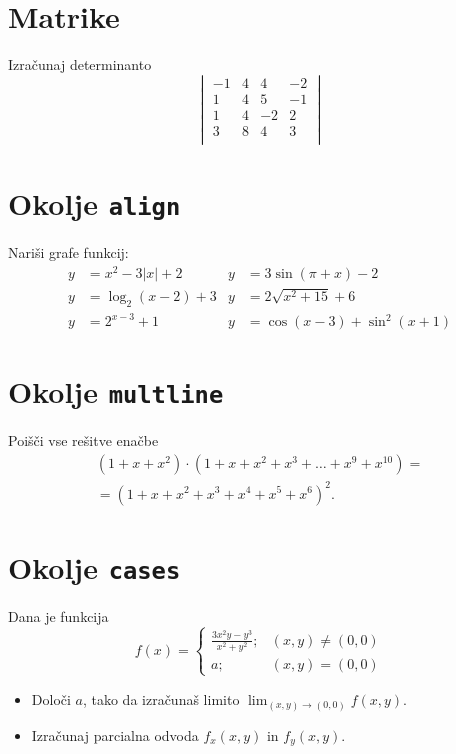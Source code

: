 \documentclass[a4paper,12pt]{article}
\begin{document}
\section*{Matrike}
Izračunaj determinanto
\[\begin{vmatrix}
-1 & 4 & 4 & -2 \\
 1 & 4 & 5 & -1 \\
 1 & 4 & -2 & 2 \\
 3 & 8 & 4 & 3 \\
\end{vmatrix}\]
   

\section*{Okolje \texttt{align}}
Nariši grafe funkcij:
\begin{align*}
   y & = x^2 - 3|x| + 2   & y & = 3 \sin(\pi+x) - 2 \\
   y & = \log_2(x-2) + 3  & y & = 2 \sqrt{x^2+15} + 6 \\
   y & = 2^{x-3} + 1      & y & = \cos(x-3) + \sin^2(x+1)
\end{align*}
 
\section*{Okolje \texttt{multline}}
Poišči vse rešitve enačbe
\begin{multline*}
(1+x+x^2) \cdot (1+x+x^2+x^3+\ldots+x^9+x^{10}) =
\\=(1+x+x^2+x^3+x^4+x^5+x^6)^2.
\end{multline*}

\section*{Okolje \texttt{cases}}
Dana je funkcija
\[ f(x) = \begin{cases}
  \frac{3x^2y-y^3}{x^2+y^2}; & (x,y)\neq(0,0) \\
  a; & (x,y)=(0,0) 
\end{cases}
\]
   
\begin{itemize}
\item Določi \(a\), tako da izračunaš limito \( \lim_{(x,y)\to(0,0)} f(x,y) \).
\item Izračunaj parcialna odvoda \(f_x(x,y)\) in \(f_y(x,y)\).
\end{itemize}
\end{document}
